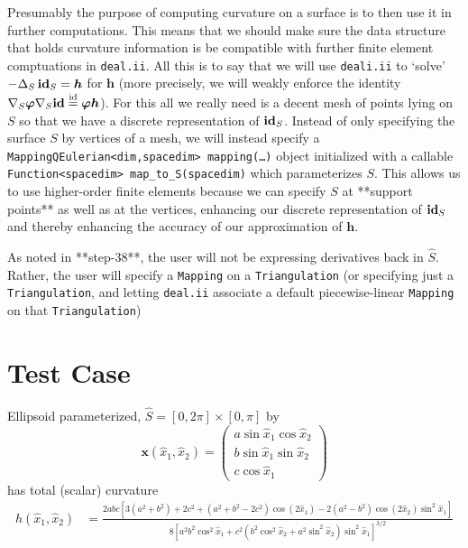 \documentclass[10pt]{article}
\newcommand{\mbf}[1]{\boldsymbol{#1}}
\begin{document}
Presumably the purpose of computing curvature on a surface is to then use it in
further computations.  This means that we should make sure the data structure that holds
curvature information is be compatible with further finite element comptuations
in \texttt{deal.ii}.  All this is to say that we will use \texttt{deali.ii} to
`solve' $- \Delta_S \, \text{\bf id}_S = \mbf{h}$ for $\mbf{h}$ (more
precisely, we will weakly enforce the identity $\nabla_S \boldsymbol{\varphi}
\nabla_S \text{\bf id} \overset{\text{id}}{=} \mbf{\varphi}\mbf{h}$).  For this
all we really need is a decent mesh of points lying on $S$ so that we have a
discrete representation of $\text{\bf id}_S$.  Instead of only specifying the
surface $S$ by vertices of a mesh, we will instead specify a
\texttt{MappingQEulerian<dim,spacedim> mapping(\dots)} object initialized with a callable
\texttt{Function<spacedim> map\_to\_S(spacedim)} which parameterizes $S$.  This
allows us to use higher-order finite elements because we can specify $S$ at
**support points** as well as at the vertices, enhancing our discrete
representation of $\text{\bf id}_S$ and thereby enhancing the accuracy of our
approximation of $\mbf{h}$. 

As noted in **step-38**, the user will not be expressing derivatives back in
$\hat{S}$.  Rather, the user will specify a \texttt{Mapping} on a
\texttt{Triangulation} (or specifying just a \texttt{Triangulation}, and
letting \texttt{deal.ii} associate a default piecewise-linear \texttt{Mapping}
on that \texttt{Triangulation})


\section*{Test Case}

Ellipsoid parameterized, $\hat{S} = [0,2\pi] \times [0, \pi]$ by 
\[  \mbf{x}(\hat{x}_1, \hat{x}_2) = 
   \left( \begin{array}{c} 
      a\sin \hat{x}_1 \cos \hat{x}_2 \\
      b\sin \hat{x}_1 \sin \hat{x}_2 \\
            c\cos\hat{x}_1 
   \end{array} \right)
\]
has total (scalar) curvature 
\begin{align*}
   h(\hat{x}_1, \hat{x}_2) &= \frac{2abc\left[ 3(a^2 + b^2) + 2c^2 + (a^2 + b^2 -
   2c^2)\cos(2\hat{x}_1) - 2(a^2 - b^2)\cos(2\hat{x}_2)\sin^2 \hat{x}_1 \right]}
                           {  8\left[a^2 b^2 \cos^2 \hat{x}_1 + c^2(b^2\cos^2 \hat{x}_2 +
                           a^2\sin^2 \hat{x}_2 ) \sin^2 \hat{x}_1 \right]^{3/2}}
\end{align*}
\end{document}
